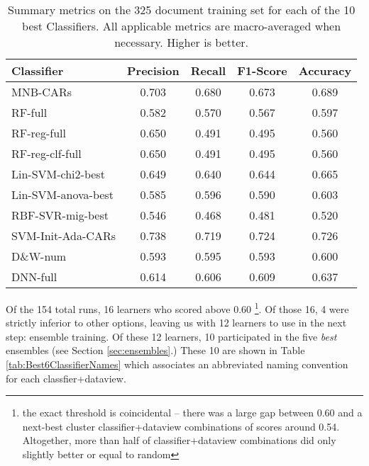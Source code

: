\begin{table}[]
\begin{tabular}{|l|c|c|c|c|}
    \textsf{ Classifier } & \textsf{ Precision } & \textsf{ Recall } & \textsf{ F1-Score } & \textsf{ Accuracy } \\ 
    \hline
    \cellcolor{gray!15} \textsf{ MNB-CARs } & 0.703 & 0.680 & 0.673 & 0.689 \\
    \cellcolor{gray!15} \textsf{ RF-full } & 0.582 & 0.570 & 0.567 & 0.597 \\
    \cellcolor{gray!15} \textsf{ RF-reg-full } & 0.650 & 0.491 & 0.495 & 0.560 \\ 
    \cellcolor{gray!15} \textsf{ RF-reg-clf-full } & 0.650 & 0.491 & 0.495 & 0.560 \\ 
   \cellcolor{gray!15} \textsf{ Lin-SVM-chi2-best } & 0.649 & 0.640 & 0.644 & 0.665 \\ 
   \cellcolor{gray!15} \textsf{ Lin-SVM-anova-best } & 0.585 & 0.596 & 0.590 & 0.603 \\ 
   \cellcolor{gray!15} \textsf{ RBF-SVR-mig-best } & 0.546 & 0.468 & 0.481 & 0.520 \\ 
   \cellcolor{gray!15} \textsf{ SVM-Init-Ada-CARs } & \cellcolor{gray!15} 0.738 & \cellcolor{gray!15} 0.719 & \cellcolor{gray!15} 0.724 & \cellcolor{gray!15} 0.726 \\ 
   \cellcolor{gray!15} \textsf{ D\&W-num } & 0.593 & 0.595 & 0.593 & 0.600 \\ 
   \cellcolor{gray!15} \textsf{ DNN-full } & 0.614 & 0.606 & 0.609 & 0.637 \\ 
   \hline
    \end{tabular}
    \caption{Summary metrics on the 325 document training set for each of the 10 best Classifiers. All applicable metrics are macro-averaged when necessary. Higher is better.}
    \label{tab:BestEnsembleClassifiersMAMetrics2}
\end{table}

Of the 154 total runs, 16 learners who scored above 0.60  \footnote{the exact threshold is coincidental -- there was a large gap between 0.60 and a next-best cluster classifier+dataview combinations of scores around 0.54. Altogether, more than half of classifier+dataview combinations did only slightly better or equal to random}. Of those 16, 4 were strictly inferior to other options, leaving us with 12 learners
to use in the next step: ensemble training.  Of these 12 learners, 10 participated in the five \textit{best} ensembles (see Section \ref{sec:ensembles}.) These 10 are shown in Table \ref{tab:Best6ClassifierNames}
 which associates an abbreviated naming convention for each classfier+dataview.

